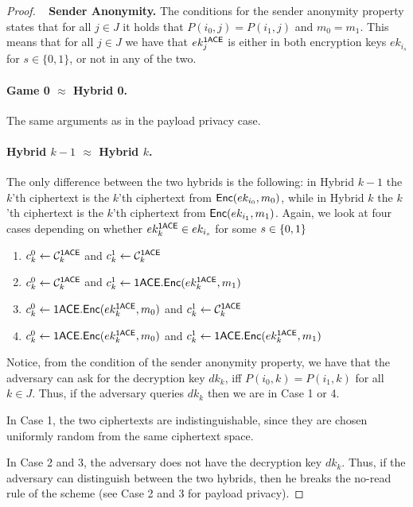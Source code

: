 \documentclass{llncs}
\begin{document}
\begin{proof}
\ \newline
\noindent\textbf{Sender Anonymity.} 
The conditions for the sender anonymity property states that for all $j \in J$ it holds that $P(i_0,j) = P(i_1,j)$ and $m_0 = m_1$.
This means that for all $j \in J$ we have that $ek_j^{\mathsf{1ACE}}$ is either in both encryption keys $ek_{i_s}$ for $s \in \{0,1 \}$, or not in any of the two.


\paragraph{Game 0 $\approx$ Hybrid 0.} The same arguments as in the payload privacy case.

\paragraph{Hybrid $k-1$ $\approx$ Hybrid $k$.} 
The only difference between the two hybrids is the following: in Hybrid $k-1$ the $k$'th \oACE ciphertext is the $k$'th ciphertext from $\mathsf{Enc}(ek_{i_0},m_0)$, while in Hybrid $k$ the $k$'th \oACE ciphertext is the $k$'th ciphertext from $\mathsf{Enc}(ek_{i_1},m_1)$.
Again, we look at four cases depending on whether $ek_k^{\mathsf{1ACE}} \in ek_{i_s}$ for some $s \in \{0,1\}$
\begin{enumerate}
\item $c_k^0 \gets \mathcal{C}_k^{\mathsf{1ACE}}$ and $c_k^1 \gets \mathcal{C}_k^{\mathsf{1ACE}}$
\item $c_k^0 \gets \mathcal{C}_k^{\mathsf{1ACE}}$ and $c_k^1 \gets \mathsf{1ACE}.\mathsf{Enc}(ek_k^{\mathsf{1ACE}},m_1)$
\item $c_k^0 \gets \mathsf{1ACE}.\mathsf{Enc}(ek_k^{\mathsf{1ACE}},m_0)$ and $c_k^1 \gets \mathcal{C}_k^{\mathsf{1ACE}}$
\item $c_k^0 \gets \mathsf{1ACE}.\mathsf{Enc}(ek_k^{\mathsf{1ACE}},m_0)$ and $c_k^1 \gets \mathsf{1ACE}.\mathsf{Enc}(ek_k^{\mathsf{1ACE}},m_1)$
\end{enumerate}

Notice, from the condition of the sender anonymity property, we have that the adversary can ask for the decryption key $dk_k$, iff $P(i_0,k) = P(i_1,k)$ for all $k\in J$. Thus, if the adversary queries $dk_k$ then we are in Case 1 or 4. 

In Case 1, the two ciphertexts are indistinguishable, since they are chosen uniformly random from the same ciphertext space. 

In Case 2 and 3, the adversary does not have the decryption key $dk_k$. Thus, if the adversary can distinguish between the two hybrids, then he breaks the no-read rule of the \oACE scheme (see Case 2 and 3 for payload privacy). 


\end{proof}
\end{document}
